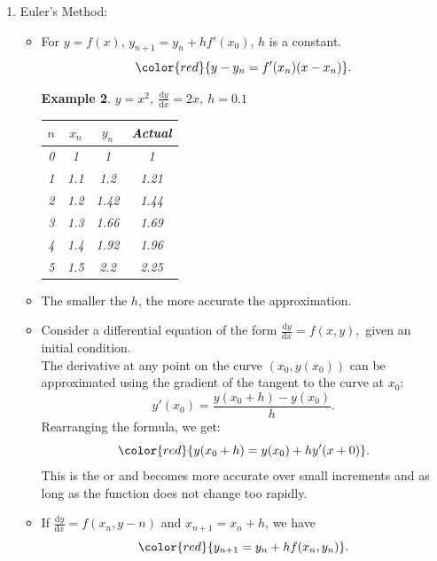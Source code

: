 \documentclass[12pt, a4paper]{article}
\newtheorem{example}{Example}[subsection]
\def\d{{\mathrm{d}}}
\begin{document}
\begin{enumerate}
\begin{example}
        $$\begin{aligned}
            e^{x^3}\frac{\d y}{\d x}+e^{x^3}\cdot 3x^2y&=e^{x^3}\cdot 6x^2\\
            \therefore \frac{\d}{\d x}\left(e^{x^3}y\right)&=e^{x^3}\cdot 6x^2\\
            \int \frac{\d}{\d x}\left(e^{x^3}y\right)\ \d x&=\int e^{x^3}\cdot 6x^2\ \d x\\
            {\color{green}{\left[\text{Let }x^3=u,\ \frac{\d u}{\d x}=2x^2,\ \d u=2x^2\ \d x\right.}}&{\color{green}{\left.\Rightarrow\ 2\int e^{u}\ \d u=2e^u+C=2e^{x^3}+C\right]}}\\
            e^{x^3}y&=2e^{x^3}+C\\
            y&=2+Ce^{-x^3}.
        \end{aligned}$$
    \end{example}
    \item Euler's Method: 
    \begin{itemize}
        \item For $y=f(x)$, $y_{n+1}=y_n+hf'(x_0)$, $h$ is a constant. $${\color{red}{y-y_n=f'(x_n)(x-x_n)}}.$$
        \begin{example}
            \textbf{$y=x^2,\ \frac{\d y}{\d x}=2x,\ h=0.1$}
            \begin{center}\begin{tabular}{c|c|c|c}
                $n$&$x_n$&$y_n$&Actual\\
                \hline
                0&1&1&1\\
                1&1.1&1.2&1.21\\
                2&1.2&1.42&1.44\\
                3&1.3&1.66&1.69\\
                4&1.4&1.92&1.96\\
                5&1.5&2.2&2.25
            \end{tabular}\end{center}
        \end{example}
        \item The smaller the $h$, the more accurate the approximation. 
        \item Consider a differential equation of the form $\frac{\d y}{\d x}=f(x,y),$ given an initial condition. \\
        The derivative at any point on the curve $(x_0, y(x_0))$ can be approximated using the gradient of the tangent to the curve at $x_0$: 
        $$y'(x_0)=\frac{y(x_0+h)-y(x_0)}{h}.$$
        Rearranging the formula, we get: 
        $${\color{red}{y(x_0+h)=y(x_0)+hy'(x+0)}}.$$
        This is the \textbf{\color{red}{linearization}} or \textbf{\color{red}{Euler's method}} and becomes more accurate over small increments and as long as the function does not change too rapidly. 
        \item If $\frac{\d y}{\d x}=f(x_n,y-n)$ and $x_{n+1}=x_n+h$, we have 
        $${\color{red}{y_{n+1}=y_n+hf(x_n,y_n)}}.$$
    \end{itemize}
\end{enumerate}
\end{document}
